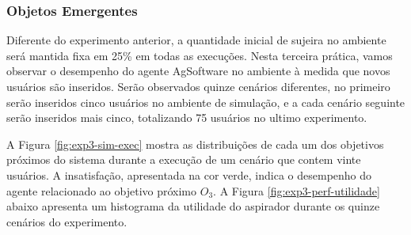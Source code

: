 \subsubsection{Objetos Emergentes}

Diferente do experimento anterior, a quantidade inicial de sujeira no ambiente será mantida fixa em 25\% em todas as execuções. Nesta terceira prática, vamos observar o desempenho do agente AgSoftware no ambiente à medida que novos usuários são inseridos. Serão observados quinze cenários diferentes, no primeiro serão inseridos cinco usuários no ambiente de simulação, e a  cada cenário seguinte serão inseridos mais cinco, totalizando 75 usuários no ultimo experimento.

\begin{figure}[h!]
    \centering
\end{figure}

A Figura \ref{fig:exp3-sim-exec} mostra as distribuições de cada um dos objetivos próximos do sistema durante a execução de um cenário que contem vinte usuários. A insatisfação, apresentada na cor verde, indica o desempenho do agente relacionado ao objetivo próximo $O_3$.  A Figura \ref{fig:exp3-perf-utilidade} abaixo apresenta um histograma da utilidade do aspirador durante os quinze cenários do experimento. 

\clearpage
\begin{figure}[h!]
    \centering
\end{figure}

